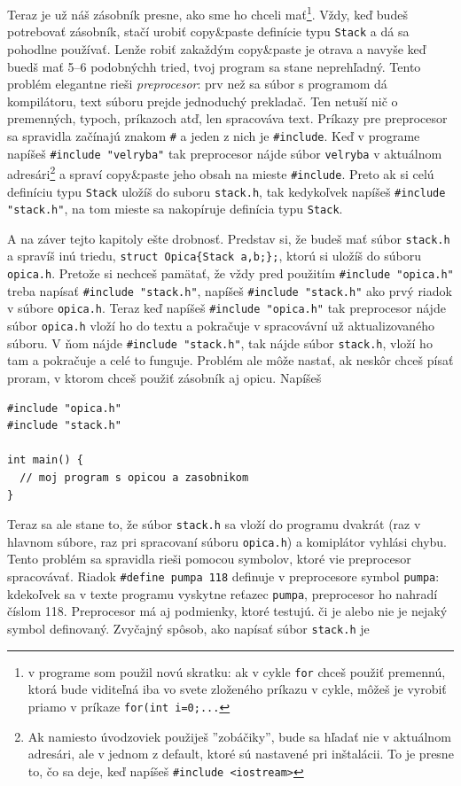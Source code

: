 \documentclass[10pt]{article}
\def\prg{\lstinline}
\def\ods{\vspace*{10pt}}
\begin{document}
Teraz je už náš zásobník presne, ako sme ho chceli mať\footnote{%
  v programe som použil novú skratku: ak v cykle \prg!for! chceš použiť
  premennú, ktorá bude viditeľná iba vo svete zloženého príkazu v cykle,
  môžeš je vyrobiť priamo v príkaze \prg!for(int i=0;...!}.
Vždy, keď budeš potrebovať zásobník, stačí urobiť copy\&paste definície
typu {\tt Stack} a dá sa pohodlne používať. Lenže robiť zakaždým copy\&paste
je otrava a navyše keď buedš mať 5--6 podobnýchh tried, tvoj program sa stane
neprehľadný. Tento problém elegantne rieši {\em preprocesor}: prv než
sa súbor s programom dá kompilátoru, text súboru prejde jednoduchý prekladač.
Ten netuší nič o premenných, typoch, príkazoch atď, len spracováva text. 
Príkazy pre preprocesor sa spravidla začínajú znakom \prg!#! a jeden z nich je
\prg!#include!. Keď v programe napíšeš \prg!#include "velryba"! tak preprocesor
nájde súbor {\tt velryba} v aktuálnom adresári\footnote{Ak namiesto úvodzoviek použiješ
''zobáčiky'', bude sa hľadať nie v aktuálnom adresári, ale v jednom z default, ktoré
sú nastavené pri inštalácii. To je presne to, čo sa deje, keď napíšeš 
\prg!#include <iostream>!} a spraví copy\&paste jeho obsah na mieste \prg!#include!.
Preto ak si celú definíciu typu {\tt Stack} uložíš do suboru {\tt stack.h}, tak
kedykoľvek napíšeš \prg!#include "stack.h"!, na tom mieste sa nakopíruje 
definícia typu {\tt Stack}.

\ods
A na záver tejto kapitoly ešte drobnosť. Predstav si, že budeš mať súbor {\tt stack.h}
a spravíš inú triedu, \prg!struct Opica{Stack a,b;};!, ktorú si uložíš do súboru
{\tt opica.h}. Pretože si nechceš pamätať, že vždy pred použitím \prg!#include "opica.h"!
treba napísať \prg!#include "stack.h"!, napíšeš \prg!#include "stack.h"! ako prvý riadok v 
súbore {\tt opica.h}. Teraz keď napíšeš \prg!#include "opica.h"! tak preprocesor nájde súbor
{\tt opica.h} vloží ho do textu a pokračuje v spracovávní už aktualizovaného súboru. V ňom
nájde \prg!#include "stack.h"!, tak nájde súbor {\tt stack.h}, vloží ho tam a pokračuje
a celé to funguje. Problém ale môže nastať, ak neskôr chceš písať proram, v ktorom chceš
použiť zásobník aj opicu. Napíšeš


\begin{lstlisting}[] 
#include "opica.h"
#include "stack.h"

int main() {
  // moj program s opicou a zasobnikom
}
\end{lstlisting}

Teraz sa ale stane to, že súbor {\tt stack.h} sa vloží do programu dvakrát (raz v 
hlavnom súbore, raz pri spracovaní súboru {\tt opica.h}) a komiplátor vyhlási chybu. Tento
problém sa spravidla rieši pomocou symbolov, ktoré vie preprocesor spracovávať.
Riadok \prg!#define pumpa 118! definuje v preprocesore symbol {\tt pumpa}: 
kdekoľvek sa v texte programu vyskytne reťazec  {\tt pumpa}, preprocesor ho nahradí 
číslom 118. Preprocesor má aj podmienky, ktoré testujú. či je alebo nie je
nejaký symbol definovaný. 
Zvyčajný spôsob, ako napísať súbor {\tt stack.h} je
\end{document}
